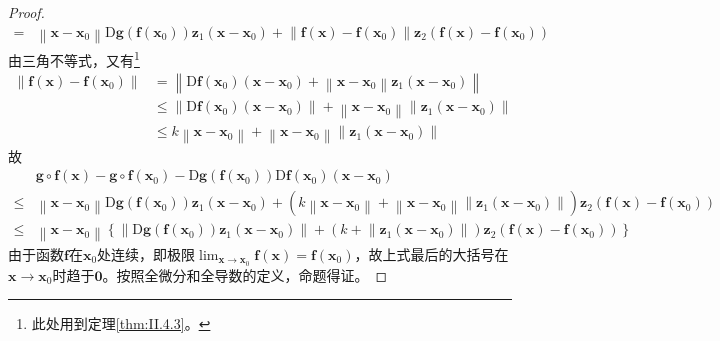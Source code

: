 \documentclass[../main.tex]{subfiles}
\begin{document}
\begin{proof}
\begin{align*}
        =               & \left\|\mathbf{x}-\mathbf{x}_0\right\|\mathrm{D}\mathbf{g}\left(\mathbf{f}\left(\mathbf{x}_0\right)\right)\mathbf{z}_1\left(\mathbf{x}-\mathbf{x}_0\right)+\left\|\mathbf{f}\left(\mathbf{x}\right)-\mathbf{f}\left(\mathbf{x}_0\right)\right\|\mathbf{z}_2\left(\mathbf{f}\left(\mathbf{x}\right)-\mathbf{f}\left(\mathbf{x}_0\right)\right)
    \end{align*}
    由三角不等式，又有\footnote{
        此处用到定理\ref{thm:II.4.3}。
    }
    \begin{align*}
        \left\|\mathbf{f}\left(\mathbf{x}\right)-\mathbf{f}\left(\mathbf{x}_0\right)\right\| & =\left\|\mathrm{D}\mathbf{f}\left(\mathbf{x}_0\right)\left(\mathbf{x}-\mathbf{x}_0\right)+\left\|\mathbf{x}-\mathbf{x}_0\right\|\mathbf{z}_1\left(\mathbf{x}-\mathbf{x}_0\right)\right\|                    \\
                                                                                             & \leq \left\|\mathrm{D}\mathbf{f}\left(\mathbf{x}_0\right)\left(\mathbf{x}-\mathbf{x}_0\right)\right\|+\left\|\mathbf{x}-\mathbf{x}_0\right\|\left\|\mathbf{z}_1\left(\mathbf{x}-\mathbf{x}_0\right)\right\| \\
                                                                                             & \leq k\left\|\mathbf{x}-\mathbf{x}_0\right\|+\left\|\mathbf{x}-\mathbf{x}_0\right\|\left\|\mathbf{z}_1\left(\mathbf{x}-\mathbf{x}_0\right)\right\|
    \end{align*}
    故
    \begin{align*}
             & \mathbf{g}\circ\mathbf{f}\left(\mathbf{x}\right)-\mathbf{g}\circ\mathbf{f}\left(\mathbf{x}_0\right)-\mathrm{D}\mathbf{g}\left(\mathbf{f}\left(\mathbf{x}_0\right)\right)\mathrm{D}\mathbf{f}\left(\mathbf{x}_0\right)\left(\mathbf{x}-\mathbf{x}_0\right)                                                                                                                                                           \\
        \leq & \left\|\mathbf{x}-\mathbf{x}_0\right\|\mathrm{D}\mathbf{g}\left(\mathbf{f}\left(\mathbf{x}_0\right)\right)\mathbf{z}_1\left(\mathbf{x}-\mathbf{x}_0\right)+\left(k\left\|\mathbf{x}-\mathbf{x}_0\right\|+\left\|\mathbf{x}-\mathbf{x}_0\right\|\left\|\mathbf{z}_1\left(\mathbf{x}-\mathbf{x}_0\right)\right\|\right)\mathbf{z}_2\left(\mathbf{f}\left(\mathbf{x}\right)-\mathbf{f}\left(\mathbf{x}_0\right)\right) \\
        \leq & \left\|\mathbf{x}-\mathbf{x}_0\right\|\left\{\left\|\mathrm{D}\mathbf{g}\left(\mathbf{f}\left(\mathbf{x}_0\right)\right)\mathbf{z}_1\left(\mathbf{x}-\mathbf{x}_0\right)\right\|+\left(k+\left\|\mathbf{z}_1\left(\mathbf{x}-\mathbf{x}_0\right)\right\|\right)\mathbf{z}_2\left(\mathbf{f}\left(\mathbf{x}\right)-\mathbf{f}\left(\mathbf{x}_0\right)\right)\right\}
    \end{align*}
    由于函数$\mathbf{f}$在$\mathbf{x}_0$处连续，即极限$\lim_{\mathbf{x}\to\mathbf{x}_0}\mathbf{f}\left(\mathbf{x}\right)=\mathbf{f}\left(\mathbf{x}_0\right)$，故上式最后的大括号在$\mathbf{x}\to\mathbf{x}_0$时趋于$\mathbf{0}$。按照全微分和全导数的定义，命题得证。
\end{proof}
\end{document}
